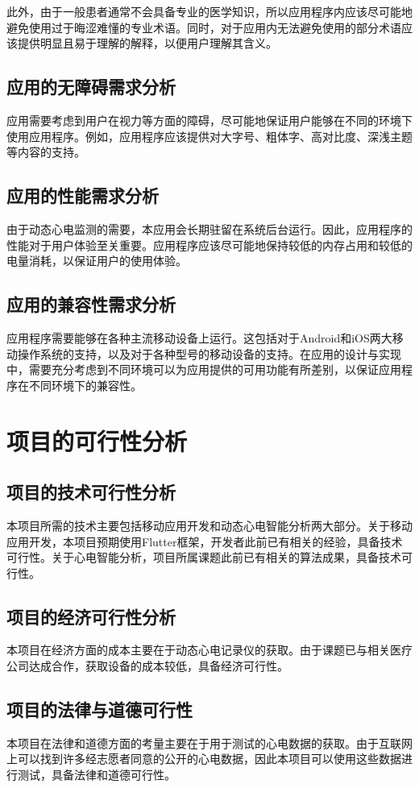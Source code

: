 此外，由于一般患者通常不会具备专业的医学知识，所以应用程序内应该尽可能地避免使用过于晦涩难懂的专业术语。同时，对于应用内无法避免使用的部分术语应该提供明显且易于理解的解释，以便用户理解其含义。

\subsection{应用的无障碍需求分析}\label{subsec:accessibility}

应用需要考虑到用户在视力等方面的障碍，尽可能地保证用户能够在不同的环境下使用应用程序。例如，应用程序应该提供对大字号、粗体字、高对比度、深浅主题等内容的支持。

\subsection{应用的性能需求分析}\label{subsec:performance}

由于动态心电监测的需要，本应用会长期驻留在系统后台运行。因此，应用程序的性能对于用户体验至关重要。应用程序应该尽可能地保持较低的内存占用和较低的电量消耗，以保证用户的使用体验。

\subsection{应用的兼容性需求分析}\label{subsec:compatibility}

应用程序需要能够在各种主流移动设备上运行。这包括对于Android和iOS两大移动操作系统的支持，以及对于各种型号的移动设备的支持。在应用的设计与实现中，需要充分考虑到不同环境可以为应用提供的可用功能有所差别，以保证应用程序在不同环境下的兼容性。


\section{项目的可行性分析}\label{sec:feasibility}

\subsection{项目的技术可行性分析}\label{subsec:tech-feasibility}

本项目所需的技术主要包括移动应用开发和动态心电智能分析两大部分。关于移动应用开发，本项目预期使用Flutter框架，开发者此前已有相关的经验，具备技术可行性。关于心电智能分析，项目所属课题此前已有相关的算法成果\cite{songDongtaixindiantudezhinengjiancesuanfayanjiuyuyingyong2022}，具备技术可行性。

\subsection{项目的经济可行性分析}\label{subsec:economic-feasibility}

本项目在经济方面的成本主要在于动态心电记录仪的获取。由于课题已与相关医疗公司达成合作，获取设备的成本较低，具备经济可行性。

\subsection{项目的法律与道德可行性}\label{subsec:legal-feasibility}

本项目在法律和道德方面的考量主要在于用于测试的心电数据的获取。由于互联网上可以找到许多经志愿者同意的公开的心电数据，因此本项目可以使用这些数据进行测试，具备法律和道德可行性。
